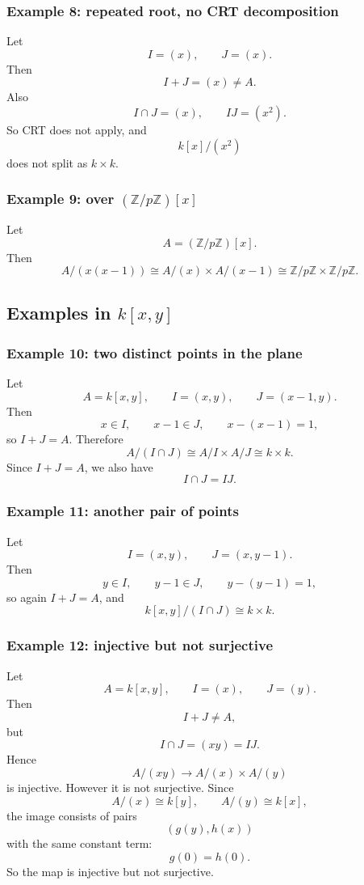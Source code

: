 \documentclass[12pt,a4paper]{article}
\theoremstyle{notespace}
\begin{document}
\subsubsection*{Example 8: repeated root, no CRT decomposition}

Let
\[
I=(x),\qquad J=(x).
\]
Then
\[
I+J=(x)\neq A.
\]
Also
\[
I\cap J=(x),\qquad IJ=(x^2).
\]
So CRT does not apply, and
\[
k[x]/(x^2)
\]
does not split as \(k\times k\).

\subsubsection*{Example 9: over \((\mathbb Z/p\mathbb Z)[x]\)}

Let
\[
A=(\mathbb Z/p\mathbb Z)[x].
\]
Then
\[
A/(x(x-1))\cong A/(x)\times A/(x-1)\cong \mathbb Z/p\mathbb Z\times \mathbb Z/p\mathbb Z.
\]

\subsection{Examples in \(k[x,y]\)}

\subsubsection*{Example 10: two distinct points in the plane}

Let
\[
A=k[x,y],\qquad I=(x,y),\qquad J=(x-1,y).
\]
Then
\[
x\in I,\qquad x-1\in J,\qquad x-(x-1)=1,
\]
so \(I+J=A\). Therefore
\[
A/(I\cap J)\cong A/I\times A/J\cong k\times k.
\]
Since \(I+J=A\), we also have
\[
I\cap J=IJ.
\]

\subsubsection*{Example 11: another pair of points}

Let
\[
I=(x,y),\qquad J=(x,y-1).
\]
Then
\[
y\in I,\qquad y-1\in J,\qquad y-(y-1)=1,
\]
so again \(I+J=A\), and
\[
k[x,y]/(I\cap J)\cong k\times k.
\]

\subsubsection*{Example 12: injective but not surjective}

Let
\[
A=k[x,y],\qquad I=(x),\qquad J=(y).
\]
Then
\[
I+J\neq A,
\]
but
\[
I\cap J=(xy)=IJ.
\]
Hence
\[
A/(xy)\to A/(x)\times A/(y)
\]
is injective. However it is not surjective. Since
\[
A/(x)\cong k[y],\qquad A/(y)\cong k[x],
\]
the image consists of pairs
\[
(g(y),h(x))
\]
with the same constant term:
\[
g(0)=h(0).
\]
So the map is injective but not surjective.
\end{document}
